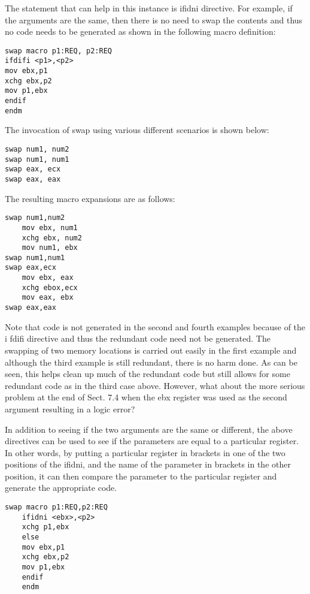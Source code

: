 \documentclass[10pt]{article}
\begin{document}
The statement that can help in this instance is ifidni directive. For example, if the arguments are the same, then there is no need to swap the contents and thus no code needs to be generated as shown in the following macro definition:

\begin{verbatim}
swap macro p1:REQ, p2:REQ
ifdifi <p1>,<p2>
mov ebx,p1
xchg ebx,p2
mov p1,ebx
endif
endm
\end{verbatim}

The invocation of swap using various different scenarios is shown below:

\begin{verbatim}
swap num1, num2
swap num1, num1
swap eax, ecx
swap eax, eax
\end{verbatim}

The resulting macro expansions are as follows:

\begin{verbatim}
swap num1,num2
    mov ebx, num1
    xchg ebx, num2
    mov num1, ebx
swap num1,num1
swap eax,ecx
    mov ebx, eax
    xchg ebox,ecx
    mov eax, ebx
swap eax,eax
\end{verbatim}

Note that code is not generated in the second and fourth examples because of the i fdifi directive and thus the redundant code need not be generated. The swapping of two memory locations is carried out easily in the first example and although the third example is still redundant, there is no harm done. As can be seen, this helps clean up much of the redundant code but still allows for some redundant code as in the third case above. However, what about the more serious problem at the end of Sect. 7.4 when the ebx register was used as the second argument resulting in a logic error?

In addition to seeing if the two arguments are the same or different, the above directives can be used to see if the parameters are equal to a particular register. In other words, by putting a particular register in brackets in one of the two positions of the ifidni, and the name of the parameter in brackets in the other position, it can then compare the parameter to the particular register and generate the appropriate code.

\begin{verbatim}
swap macro p1:REQ,p2:REQ
    ifidni <ebx>,<p2>
    xchg p1,ebx
    else
    mov ebx,p1
    xchg ebx,p2
    mov p1,ebx
    endif
    endm
\end{verbatim}
\end{document}
